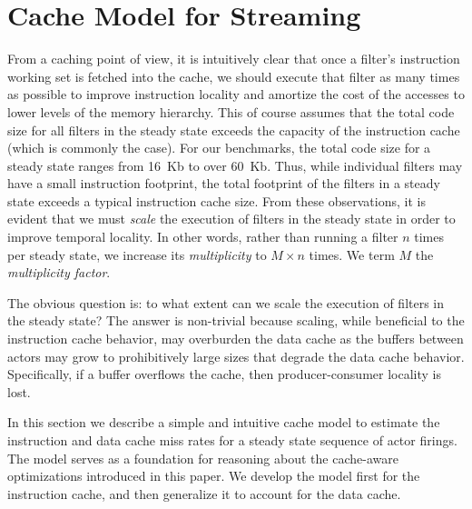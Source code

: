 \section{Cache Model for Streaming}
\label{sec:cache-model}

From a caching point of view, it is intuitively clear that once a
filter's instruction working set is fetched into the cache, we should
execute that filter as many times as possible to improve instruction
locality and amortize the cost of the accesses to lower levels of the
memory hierarchy. This of course assumes that the total code size for
all filters in the steady state exceeds the capacity of the
instruction cache (which is commonly the case).
For our benchmarks, the total code size for a steady state
ranges from 16~Kb to over 60~Kb. Thus, while individual filters may have a
small instruction footprint, the total footprint of the filters in a
steady state exceeds a typical instruction cache size.
From these observations, it is evident that we must {\it scale} the
execution of filters in the steady state in order to improve temporal
locality. In other words, rather than running a filter $n$ times per
steady state, we increase its {\it multiplicity} to $M \times n$ 
times.
We term $M$ the {\it multiplicity factor}.

The obvious question is: to what extent can we scale the execution of
filters in the steady state? The answer is non-trivial because
scaling, while beneficial to the instruction cache behavior, may
overburden the data cache as the buffers between actors may grow to
prohibitively large sizes that degrade the data cache
behavior. Specifically, if a buffer overflows the cache, then
producer-consumer locality is lost.

In this section we describe a simple and intuitive cache model to
estimate the instruction and data cache miss rates for a steady state
sequence of actor firings. The model serves as a foundation for
reasoning about the cache-aware optimizations introduced in this
paper. We develop the model first for the instruction cache, and then
generalize it to account for the data cache.




